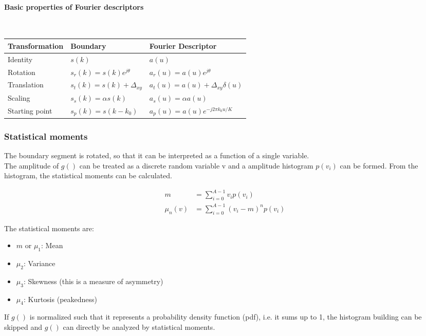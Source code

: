 \paragraph{Basic properties of Fourier descriptors} ~\\

\begin{tabularx}{\textwidth}{XXX}
Transformation & Boundary & Fourier Descriptor \\\hline
Identity & $s(k)$ & $a(u)$ \\
Rotation & $s_r(k)=s(k)e^{j\theta}$& $a_r(u)=a(u)e^{j\theta}$ \\
Translation &$s_t(k)=s(k)+\Delta_{xy}$& $a_t(u)=a(u)+\Delta_{xy}\delta(u)$ \\
Scaling &$s_s(k)=\alpha s(k)$& $a_s(u)=\alpha a(u)$ \\
Starting point & $s_p(k)=s(k-k_0)$& $a_p(u)=a(u)e^{-j2\pi k_0u/K}$ \\ \hline
\end{tabularx}

\subsubsection{Statistical moments}
The boundary segment is rotated, so that it can be interpreted as a function of a single variable. \\

The amplitude of $g()$ can be treated as a discrete random variable v and a amplitude histogram $p(v_i)$ can be formed.
From the histogram, the statistical moments can be calculated.

\begin{align*}
	m &= \sum\limits_{i=0}^{A-1} v_i p(v_i) \\
	\mu_n(v) &= \sum\limits_{i=0}^{A-1} (v_i-m)^n p(v_i)
\end{align*}

The statistical moments are:
\begin{itemize}
\item $m$ or $\mu_1$: Mean
\item $\mu_2$: Variance
\item $\mu_3$: Skewness (this is a measure of asymmetry)
\item $\mu_4$: Kurtosis (peakedness)
\end{itemize}

If $g()$ is normalized such that it represents a probability density function (pdf), i.e. it sums up to 1,
the histogram building can be skipped and $g()$ can directly be analyzed by statistical moments.

